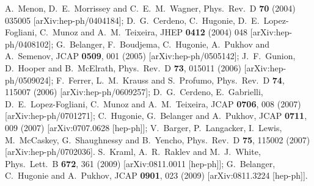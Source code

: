 \documentclass[aps,12pt,superscriptaddress,nofootinbib,floatfix,showpacs]{revtex4}
\begin{document}
\begin{thebibliography}{99}
A.~Menon, D.~E.~Morrissey and C.~E.~M.~Wagner,
  Phys.\ Rev.\  D {\bf 70} (2004) 035005
  [arXiv:hep-ph/0404184];
  D.~G.~Cerdeno, C.~Hugonie, D.~E.~Lopez-Fogliani, C.~Munoz and A.~M.~Teixeira,
  JHEP {\bf 0412} (2004) 048
  [arXiv:hep-ph/0408102];
  G.~Belanger, F.~Boudjema, C.~Hugonie, A.~Pukhov and A.~Semenov,
  JCAP {\bf 0509}, 001 (2005)
  [arXiv:hep-ph/0505142];
  J.~F.~Gunion, D.~Hooper and B.~McElrath,
  Phys.\ Rev.\  D {\bf 73}, 015011 (2006)
  [arXiv:hep-ph/0509024];
  F.~Ferrer, L.~M.~Krauss and S.~Profumo,
  Phys.\ Rev.\  D {\bf 74}, 115007 (2006)
  [arXiv:hep-ph/0609257];
   D.~G.~Cerdeno, E.~Gabrielli, D.~E.~Lopez-Fogliani, C.~Munoz and A.~M.~Teixeira,
  JCAP {\bf 0706}, 008 (2007)
  [arXiv:hep-ph/0701271];
  C.~Hugonie, G.~Belanger and A.~Pukhov,
  JCAP {\bf 0711}, 009 (2007)
  [arXiv:0707.0628 [hep-ph]];
  V.~Barger, P.~Langacker, I.~Lewis, M.~McCaskey, G.~Shaughnessy and B.~Yencho,
  Phys.\ Rev.\  D {\bf 75}, 115002 (2007)
  [arXiv:hep-ph/0702036].
  S.~Kraml, A.~R.~Raklev and M.~J.~White,
  Phys.\ Lett.\  B {\bf 672}, 361 (2009)
  [arXiv:0811.0011 [hep-ph]];
  G.~Belanger, C.~Hugonie and A.~Pukhov,
  JCAP {\bf 0901}, 023 (2009)
  [arXiv:0811.3224 [hep-ph]].
  


%
%





\end{thebibliography}
\end{document}
